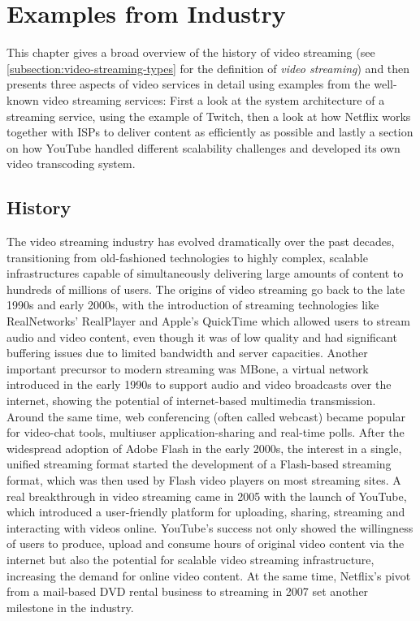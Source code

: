 \chapter{Examples from Industry}\label{chapter:examples}

This chapter gives a broad overview of the history of video streaming (see \autoref{subsection:video-streaming-types} for the definition of \textit{video streaming}) and then presents three aspects of video services in detail using examples from the well-known video streaming services: First a look at the system architecture of a streaming service, using the example of Twitch, then a look at how Netflix works together with \ac{ISPs} to deliver content as efficiently as possible and lastly a section on how YouTube handled different scalability challenges and developed its own video transcoding system.     

\section{History}
The video streaming industry has evolved dramatically over the past decades, transitioning from old-fashioned technologies to highly complex, scalable infrastructures capable of simultaneously delivering large amounts of content to hundreds of millions of users. The origins of video streaming go back to the late 1990s and early 2000s, with the introduction of streaming technologies like RealNetworks’ RealPlayer and Apple’s QuickTime which allowed users to stream audio and video content, even though it was of low quality and had significant buffering issues due to limited bandwidth and server capacities.
Another important precursor to modern streaming was \ac{MBone}, a virtual network introduced in the early 1990s to support audio and video broadcasts over the internet, showing the potential of internet-based multimedia transmission. Around the same time, web conferencing (often called webcast) became popular for video-chat tools, multiuser application-sharing and real-time polls. 
After the widespread adoption of Adobe Flash in the early 2000s, the interest in a single, unified streaming format started the development of a Flash-based streaming format, which was then used by Flash video players on most streaming sites.
A real breakthrough in video streaming came in 2005 with the launch of YouTube, which introduced a user-friendly platform for uploading, sharing, streaming and interacting with videos online. 
YouTube's success not only showed the willingness of users to produce, upload and consume hours of original video content via the internet but also the potential for scalable video streaming infrastructure, increasing the demand for online video content. At the same time, Netflix's pivot from a mail-based DVD rental business to streaming in 2007 set another milestone in the industry. 

